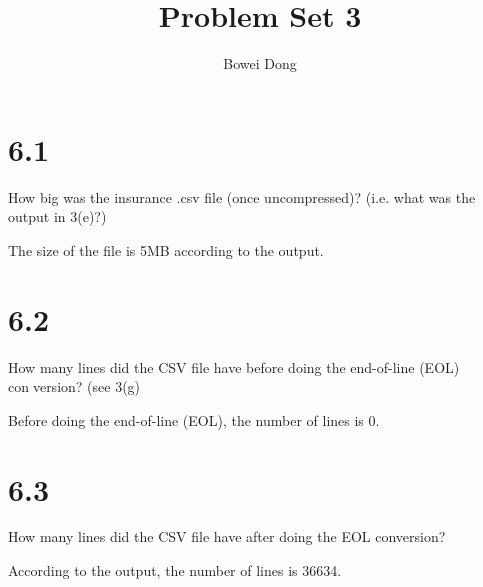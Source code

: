 \documentclass{article}
\title{Problem Set 3}
\author{Bowei Dong }
\date{}
\begin{document}
\maketitle

\section*{6.1}
How big was the insurance .csv file (once uncompressed)? (i.e. what was the
output in 3(e)?)

The size of the file is 5MB according to the output.

\section*{6.2}
How many lines did the CSV file have before doing the end-of-line (EOL) conversion? (see 3(g)

Before doing the end-of-line (EOL), the number of lines is 0.

\section*{6.3}
How many lines did the CSV file have after doing the EOL conversion?

According to the output, the number of lines is 36634. 
\end{document}
